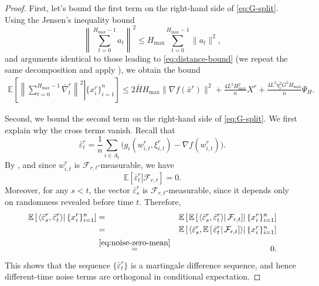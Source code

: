 \documentclass{article}
\newcommand{\anglebr}[1]{\left\langle#1\right\rangle} %
\newcommand{\inner}[2]{\anglebr{#1, #2}}
\newcommand{\cF}{\mathcal{F}}
\newcommand{\ExpCond}[2]{{\mathbb{E}}\left[\left.#1\right\vert#2\right]}
\theoremstyle{plain}
\theoremstyle{definition}
\begin{document}
\begin{proof}
First, let's bound the first term on the right-hand side of \eqref{eq:G-split}. Using the Jensen's inequality  bound
\[
\left\|\sum_{t=0}^{H_{\max}-1} a_t\right\|^2
\le
H_{\max}\sum_{t=0}^{H_{\max}-1}\|a_t\|^2,
\]
and arguments identical to those leading to \eqref{eq:distance-bound} (we repeat the same decomposition and apply ), we obtain the bound
\begin{eqnarray}
\ExpCond{ \left\|\sum_{t=0}^{H_{\max}-1}\bar\nabla_t^r\right\|^2 }{ \{x_i^r\}_{i=1}^n }
\leq
2\bar H H_{\max}\|\nabla f(\bar x^r)\|^2
+
\frac{4L^2H_{\max}^2}{n}X^r
+
\frac{4L^2\eta_r^2G^2H_{\max}}{n}\Psi_H.
\label{eq:mean-term}
\end{eqnarray}

Second, we bound the second term on the right-hand side of \eqref{eq:G-split}. We first explain why the cross terms vanish. Recall that
\[
\bar\varepsilon_t^r
=
\frac{1}{n}\sum_{i\in A_t}
\bigl(g_i(w_{i,t}^r,\xi_{i,t}^r)-\nabla f(w_{i,t}^r)\bigr).
\]
By , and since \(w_{i,t}^r\) is \(\cF_{r,t}\)-measurable, we have
\begin{equation}
\ExpCond{\bar\varepsilon_t^r}{\cF_{r,t}} = 0.
\label{eq:noise-zero-mean}
\end{equation}
Moreover, for any \(s<t\), the vector \(\bar\varepsilon_s^r\) is \(\cF_{r,t}\)-measurable, since it depends only on randomness revealed before time \(t\). Therefore,
\begin{eqnarray}
\ExpCond{\inner{\bar\varepsilon_s^r}{\bar\varepsilon_t^r}}{\{x_i^r\}_{i=1}^n}
&=&
\ExpCond{
\ExpCond{\inner{\bar\varepsilon_s^r}{\bar\varepsilon_t^r}}{\cF_{r,t}}
}{\{x_i^r\}_{i=1}^n}
\notag\\
&=&
\ExpCond{
\inner{\bar\varepsilon_s^r}{\ExpCond{\bar\varepsilon_t^r}{\cF_{r,t}}}
}{\{x_i^r\}_{i=1}^n}
\notag\\
&\overset{\eqref{eq:noise-zero-mean}}{=}&
0.
\label{eq:cross-terms-zero}
\end{eqnarray}
This shows that the sequence \(\{\bar\varepsilon_t^r\}\) is a martingale difference sequence, and hence different-time noise terms are orthogonal in conditional expectation.


\end{proof}
\end{document}
